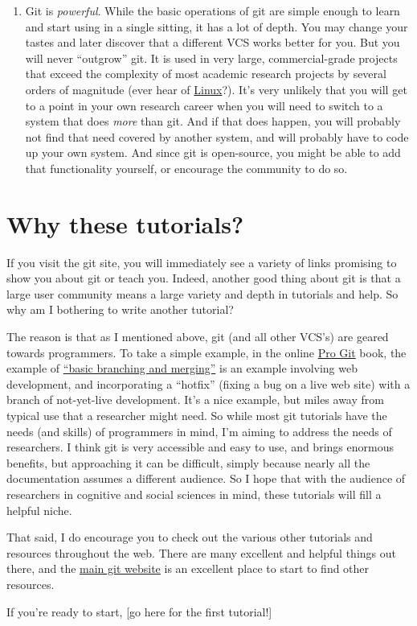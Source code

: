 \documentclass{article}
\begin{document}
\begin{enumerate}
\item Git is \emph{powerful}. While the basic operations of git are simple enough to learn and start using in a single sitting, it has a lot of depth. You may change your tastes and later discover that a different VCS works better for you. But you will never ``outgrow'' git. It is used in very large, commercial-grade projects that exceed the complexity of most academic research projects by several orders of magnitude (ever hear of \href{http://en.wikipedia.org/wiki/Linux}{Linux}?). It's very unlikely that you will get to a point in your own research career when you will need to switch to a system that does \emph{more} than git.  And if that does happen, you will probably not find that need covered by another system, and will probably have to code up your own system. And since git is open-source, you might be able to add that functionality yourself, or encourage the community to do so.
\end{enumerate}
\section{Why these tutorials?}
\label{sec-5}

If you visit the git site, you will immediately see a variety of links promising to show you about git or teach you. Indeed, another good thing about git is that a large user community means a large variety and depth in tutorials and help. So why am I bothering to write another tutorial?

The reason is that as I mentioned above, git (and all other VCS's) are geared towards programmers. To take a simple example, in the online \href{http://git-scm.com/doc}{Pro Git} book, the example of \href{http://git-scm.com/book/en/Git-Branching-Basic-Branching-and-Merging}{``basic branching and merging''} is an example involving web development, and incorporating a ``hotfix'' (fixing a bug on a live web site) with a branch of not-yet-live development. It's a nice example, but miles away from typical use that a researcher might need. So while most git tutorials have the needs (and skills) of programmers in mind, I'm aiming to address the needs of researchers.  I think git is very accessible and easy to use, and brings enormous benefits, but approaching it can be difficult, simply because nearly all the documentation assumes a different audience.  So I hope that with the audience of researchers in cognitive and social sciences in mind, these tutorials will fill a helpful niche.

That said, I do encourage you to check out the various other tutorials and resources throughout the web.  There are many excellent and helpful things out there, and the \href{http://git-scm.com/}{main git website} is an excellent place to start to find other resources.

\vspace{.5in}
If you're ready to start, [go here for the first tutorial!]
\end{document}
